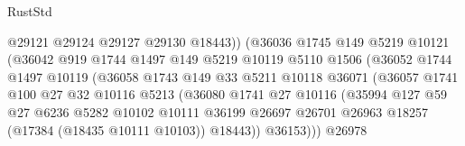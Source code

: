 \begin{lexlean}{RustStd}
\begin{coremodule}
                                  @29121
                                  @29124
                                  @29127
                                  @29130
                                  @18443))
                              (@36036
                                @1745
                                @149
                                @5219
                                @10121
                                (@36042
                                  @919
                                  @1744
                                  @1497
                                  @149
                                  @5219
                                  @10119
                                  @5110
                                  @1506
                                  (@36052
                                    @1744
                                    @1497
                                    @10119
                                    (@36058
                                      @1743
                                      @149
                                      @33
                                      @5211
                                      @10118
                                      @36071
                                      (@36057
                                        @1741
                                        @100
                                        @27
                                        @32
                                        @10116
                                        @5213
                                        (@36080
                                          @1741
                                          @27
                                          @10116
                                          (@35994
                                            @127
                                            @59
                                            @27
                                            @6236
                                            @5282
                                            @10102
                                            @10111
                                            @36199
                                            @26697
                                            @26701
                                            @26963
                                            @18257
                                            (@17384 (@18435 @10111 @10103))
                                            @18443))
                                        @36153)))
                                  @26978

\end{coremodule}
\end{lexlean}
